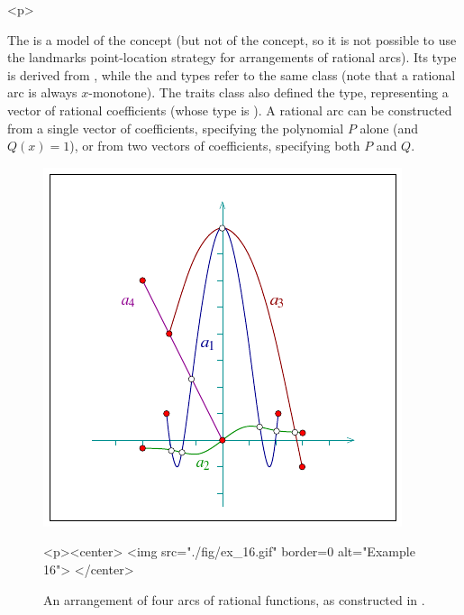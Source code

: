 \begin{ccHtmlOnly}<p>\end{ccHtmlOnly}
The  is a model of the
 concept (but not of the
 concept, so it is not possible
to use the landmarks point-location strategy for arrangements of
rational arcs). Its  type is derived from
, while the  and
 types refer to the same class (note that
a rational arc is always $x$-monotone). The traits class also
defined the  type, representing a vector of
rational coefficients (whose type is ). A
rational arc can be constructed from a single vector of
coefficients, specifying the polynomial $P$ alone (and $Q(x) =
1$), or from two vectors of coefficients, specifying both $P$ and
$Q$.

\begin{figure}[!htp]
\begin{ccTexOnly}
  \begin{center}
  \includegraphics{Arrangement_2/fig/ex_16}
  \end{center}
\end{ccTexOnly}
\begin{ccHtmlOnly}
  <p><center>
  <img src="./fig/ex_16.gif" border=0 alt="Example 16">
  </center>
\end{ccHtmlOnly}
\caption{An arrangement of four arcs of rational functions, as
constructed in .}
\label{arr_fig:ex_16}
\end{figure}

